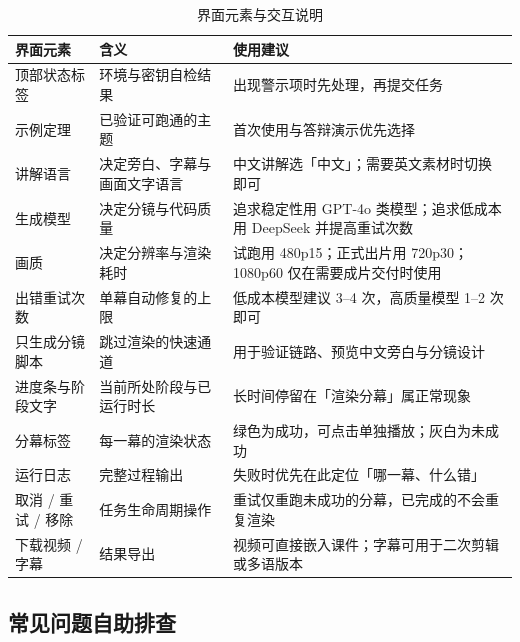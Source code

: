 \documentclass[11pt,a4paper]{ctexart}
\begin{document}
\begin{table}[htbp]
\centering
\small
\caption{界面元素与交互说明}
\begin{tabularx}{\textwidth}{@{}p{3.2cm} p{4.4cm} X@{}}
\toprule
\textbf{界面元素} & \textbf{含义} & \textbf{使用建议} \\
\midrule
顶部状态标签 & 环境与密钥自检结果 & 出现警示项时先处理，再提交任务 \\
示例定理 & 已验证可跑通的主题 & 首次使用与答辩演示优先选择 \\
讲解语言 & 决定旁白、字幕与画面文字语言 & 中文讲解选「中文」；需要英文素材时切换即可 \\
生成模型 & 决定分镜与代码质量 & 追求稳定性用 GPT-4o 类模型；追求低成本用 DeepSeek 并提高重试次数 \\
画质 & 决定分辨率与渲染耗时 & 试跑用 480p15；正式出片用 720p30；1080p60 仅在需要成片交付时使用 \\
出错重试次数 & 单幕自动修复的上限 & 低成本模型建议 3--4 次，高质量模型 1--2 次即可 \\
只生成分镜脚本 & 跳过渲染的快速通道 & 用于验证链路、预览中文旁白与分镜设计 \\
进度条与阶段文字 & 当前所处阶段与已运行时长 & 长时间停留在「渲染分幕」属正常现象 \\
分幕标签 & 每一幕的渲染状态 & 绿色为成功，可点击单独播放；灰白为未成功 \\
运行日志 & 完整过程输出 & 失败时优先在此定位「哪一幕、什么错」 \\
取消 / 重试 / 移除 & 任务生命周期操作 & 重试仅重跑未成功的分幕，已完成的不会重复渲染 \\
下载视频 / 字幕 & 结果导出 & 视频可直接嵌入课件；字幕可用于二次剪辑或多语版本 \\
\bottomrule
\end{tabularx}
\end{table}

\subsection{常见问题自助排查}
\end{document}
